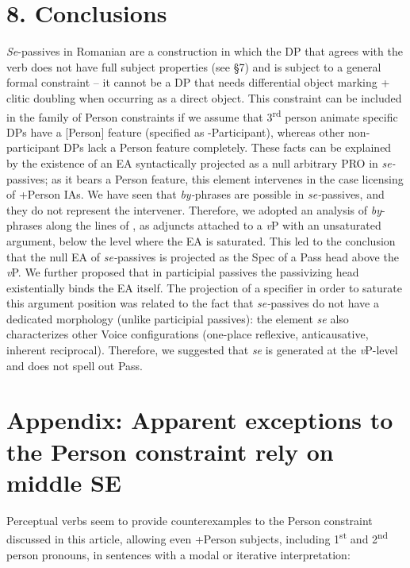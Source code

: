 \documentclass[output=paper]{langsci/langscibook}
\begin{document}
\section{ 8. Conclusions}

\textit{Se}{}-passives in Romanian are a construction in which the DP that agrees with the verb does not have full subject properties (see §7) and is subject to a general formal constraint – it cannot be a DP that needs differential object marking + clitic doubling when occurring as a direct object. This constraint can be included in the family of Person constraints if we assume that 3\textsuperscript{rd} person animate specific DPs have a [Person] feature (specified as -Participant), whereas other non-participant DPs lack a Person feature completely. These facts can be explained by the existence of an EA syntactically projected as a null arbitrary PRO in \textit{se-}passives; as it bears a Person feature, this element intervenes in the case licensing of +Person IAs. We have seen that \textit{by-}phrases are possible in \textit{se-}passives, and they do not represent the intervener. Therefore, we adopted an analysis of \textit{by}{}-phrases along the lines of \citet{Bruening2012}, as adjuncts attached to a \textit{v}P with an unsaturated argument, below the level where the EA is saturated. This led to the conclusion that the null EA of \textit{se-}passives is projected as the Spec of a Pass head above the \textit{v}P. We further proposed that in participial passives the passivizing head existentially binds the EA itself. The projection of a specifier in order to saturate this argument position was related to the fact that \textit{se-}passives do not have a dedicated morphology (unlike participial passives): the element \textit{se} also characterizes other Voice configurations (one-place reflexive, anticausative, inherent reciprocal). Therefore, we suggested that \textit{se} is generated at the \textit{v}P-level and does not spell out Pass.

\section{ Appendix: Apparent exceptions to the Person constraint rely on middle SE}

Perceptual verbs seem to provide counterexamples to the Person constraint discussed in this article, allowing even +Person subjects, including 1\textsuperscript{st} and 2\textsuperscript{nd} person pronouns, in sentences with a modal or iterative interpretation:
\end{document}
